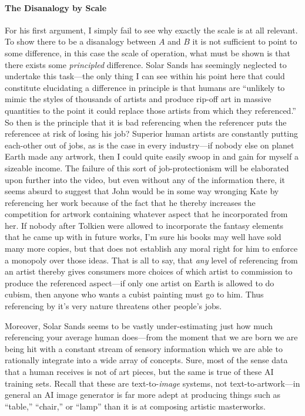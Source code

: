 \documentclass[11pt]{article}
\begin{document}
\paragraph*{The Disanalogy by Scale}
\label{sec:orga2774a9}
For his first argument, I simply fail to see why exactly the scale is at all relevant. To show there to be a disanalogy between \(A\) and \(B\) it is not sufficient to point to some difference, in this case the scale of operation, what must be shown is that there exists some \emph{principled} difference. Solar Sands has seemingly neglected to undertake this task---the only thing I can see within his point here that could constitute elucidating a difference in principle is that humans are ``unlikely to mimic the styles of thousands of artists and produce rip-off art in massive quantities to the point it could replace those artists from which they referenced.'' So then is the principle that it is bad referencing when the referencer puts the referencee at risk of losing his job? Superior human artists are constantly putting each-other out of jobs, as is the case in every industry---if nobody else on planet Earth made any artwork, then I could quite easily swoop in and gain for myself a sizeable income. The failure of this sort of job-protectionism will be elaborated upon further into the video, but even without any of the information there, it seems absurd to suggest that John would be in some way wronging Kate by referencing her work because of the fact that he thereby increases the competition for artwork containing whatever aspect that he incorporated from her. If nobody after Tolkien were allowed to incorporate the fantasy elements that he came up with in future works, I'm sure his books may well have sold many more copies, but that does not establish any moral right for him to enforce a monopoly over those ideas. That is all to say, that \emph{any} level of referencing from an artist thereby gives consumers more choices of which artist to commission to produce the referenced aspect---if only one artist on Earth is allowed to do cubism, then anyone who wants a cubist painting must go to him. Thus referencing by it's very nature threatens other people's jobs.

Moreover, Solar Sands seems to be vastly under-estimating just how much referencing your average human does---from the moment that we are born we are being hit with a constant stream of sensory information which we are able to rationally integrate into a wide array of concepts. Sure, most of the sense data that a human receives is not of art pieces, but the same is true of these AI training sets. Recall that these are text-to-\emph{image} systems, not text-to-artwork---in general an AI image generator is far more adept at producing things such as ``table,'' ``chair,'' or ``lamp'' than it is at composing artistic masterworks.
\end{document}

